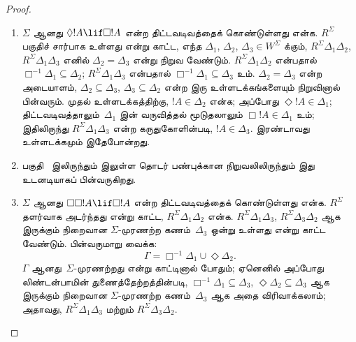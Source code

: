 \documentclass[../../../include/open-logic-section]{subfiles}
\begin{document}
\begin{proof}
  \begin{enumerate}
  \item $\Sigma$ ஆனது $\Diamond !A \lif \Box !A$ என்ற திட்டவடிவத்தைக்
    கொண்டுள்ளது என்க. $R^\Sigma$ பகுதிச் சார்பாக உள்ளது என்று காட்ட,
    எந்த $\Delta_1$, $\Delta_2$, $\Delta_3 \in W^\Sigma$ க்கும்,
    $R^\Sigma \Delta_1\Delta_2$, $R^\Sigma \Delta_1\Delta_3$ எனில்
    $\Delta_2=\Delta_3$ என்று நிறுவ வேண்டும். $R^\Sigma
    \Delta_1\Delta_2$ என்பதால் $\Box^{-1}\Delta_1 \subseteq \Delta_2$;
    $R^\Sigma \Delta_1\Delta_3$ என்பதால் $\Box^{-1}\Delta_1
    \subseteq \Delta_3$ உம். $\Delta_2=\Delta_3$ என்ற
    அடையாளம், $\Delta_2 \subseteq \Delta_3$, $\Delta_3 \subseteq
    \Delta_2$ என்ற இரு உள்ளடக்கங்களையும் நிறுவினால் பின்வரும். முதல்
    உள்ளடக்கத்திற்கு, $!A \in \Delta_2$ என்க; அப்போது
    $\Diamond!A \in \Delta_1$; திட்டவடிவத்தாலும்~$\Delta_1$ இன்
    வருவித்தல் மூடுதலாலும் $\Box!A \in \Delta_1$ உம்; இதிலிருந்து
    $R^\Sigma \Delta_1\Delta_3$ என்ற கருதுகோளின்படி,
    $!A \in \Delta_3$. இரண்டாவது உள்ளடக்கமும் இதேபோன்றது.

  \item பகுதி~ இலிருந்தும்
     இலுள்ள தொடர் பண்புக்கான நிறுவலிலிருந்தும்
    இது உடனடியாகப் பின்வருகிறது.

  \item $\Sigma$ ஆனது $\Box\Box!A \lif \Box!A$ என்ற திட்டவடிவத்தைக்
    கொண்டுள்ளது என்க. $R^\Sigma$ தளர்வாக அடர்ந்தது என்று காட்ட,
    $R^\Sigma \Delta_1\Delta_2$ என்க. $R^\Sigma \Delta_1\Delta_3$,
    $R^\Sigma \Delta_3\Delta_2$ ஆக இருக்கும் நிறைவான
    $\Sigma$-முரணற்ற கணம்~$\Delta_3$ ஒன்று உள்ளது என்று காட்ட வேண்டும்.
    பின்வருமாறு வைக்க:
    \[
    \Gamma = \Box^{-1}\Delta_1 \cup \Diamond\Delta_2.
    \]
    $\Gamma$ ஆனது~$\Sigma$-முரணற்றது என்று காட்டினால் போதும்; ஏனெனில்
    அப்போது லிண்டன்பாமின் துணைத்தேற்றத்தின்படி, $\Box^{-1}\Delta_1
    \subseteq \Delta_3$, $\Diamond\Delta_2 \subseteq \Delta_3$ ஆக
    இருக்கும் நிறைவான $\Sigma$-முரணற்ற கணம்~$\Delta_3$ ஆக அதை
    விரிவாக்கலாம்; அதாவது, $R^\Sigma \Delta_1\Delta_3$ மற்றும் $R^\Sigma
    \Delta_3\Delta_2$.


\end{enumerate}
\end{proof}
\end{document}
